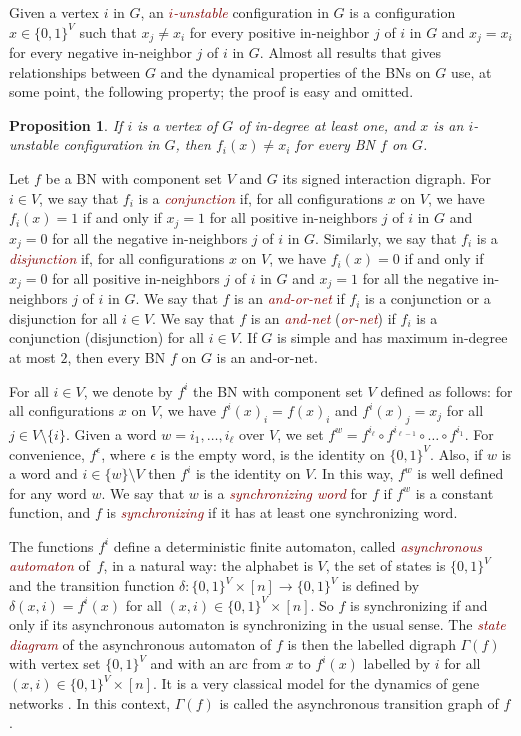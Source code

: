 \documentclass[11pt,letter]{article}
\newtheorem{proposition}{Proposition}
\newcommand{\EM}[1]{{\em\textcolor{Maroon}{#1}}}
\newcommand{\B}{\{0,1\}}
\begin{document}
\medskip
Given a vertex $i$ in $G$, an \EM{$i$-unstable} configuration in $G$ is a configuration $x\in\B^V$ such that $x_j\neq x_i$ for every positive in-neighbor $j$ of $i$ in $G$ and $x_j= x_i$ for every negative in-neighbor $j$ of $i$ in $G$. Almost all results that gives relationships between $G$ and the dynamical properties of the BNs on $G$ use, at some point, the following property; the proof is easy and omitted.  

\begin{proposition}\label{pro:flipping}
If $i$ is a vertex of $G$ of in-degree at least one, and $x$ is an $i$-unstable configuration in $G$, then $f_i(x)\neq x_i$ for every BN $f$ on $G$. 
\end{proposition}

Let $f$ be a BN with component set $V$ and $G$ its signed interaction digraph. For $i\in V$, we say that $f_i$ is a \EM{conjunction} if, for all configurations $x$ on $V$, we have $f_i(x)=1$ if and only if $x_j=1$ for all positive in-neighbors $j$ of $i$ in $G$ and $x_j=0$ for all the negative in-neighbors $j$ of $i$ in $G$. Similarly, we say that $f_i$ is a \EM{disjunction} if, for all configurations $x$ on $V$, we have $f_i(x)=0$ if and only if $x_j=0$ for all positive in-neighbors $j$ of $i$ in $G$ and $x_j=1$ for all the negative in-neighbors $j$ of $i$ in $G$. We say that $f$ is an \EM{and-or-net} if $f_i$ is a conjunction or a disjunction for all $i\in V$. We say that $f$ is an \EM{and-net} (\EM{or-net}) if $f_i$ is a conjunction (disjunction) for all $i\in V$. If $G$ is simple and has maximum in-degree at most $2$, then every BN $f$ on $G$ is an and-or-net.   

\medskip
For all $i\in V$, we denote by $f^i$ the BN with component set $V$ defined as follows: for all configurations $x$ on $V$, we have $f^i(x)_i=f(x)_i$ and $f^i(x)_j=x_j$ for all $j\in V\setminus\{i\}$. Given a word $w=i_1,\dots,i_\ell$ over $V$, we set 
$f^w=f^{i_\ell}\circ f^{i_{\ell-1}}\circ\dots\circ f^{i_1}$. For convenience, $f^\epsilon$, where $\epsilon$ is the empty word, is the identity on $\B^V$. Also, if $w$ is a word and $i\in\{w\}\setminus V$ then $f^i$ is the identity on $V$. In this way, $f^w$ is well defined for any word $w$. We say that $w$ is a \EM{synchronizing word} for $f$ if $f^w$ is a constant function, and $f$ is \EM{synchronizing} if it has at least one synchronizing word.

\medskip
The functions $f^i$ define a deterministic finite automaton, called \EM{asynchronous automaton} of~$f$, in a natural way: the alphabet is $V$, the set of states is $\B^V$ and the transition function $\delta:\B^V\times [n]\to\B^V$ is defined by $\delta(x,i)=f^i(x)$ for all $(x,i)\in\B^V\times [n]$. So $f$ is synchronizing if and only if its asynchronous automaton is synchronizing in the usual sense. The \EM{state diagram} of the asynchronous automaton of $f$ is then the labelled digraph $\Gamma(f)$ with vertex set $\B^V$ and with an arc from $x$ to $f^i(x)$ labelled by $i$ for all $(x,i)\in\B^V\times [n]$. It is a very classical model for the dynamics of gene networks \cite{T73,TA90}. In this context, $\Gamma(f)$ is called the asynchronous transition graph of $f$. 
\end{document}
